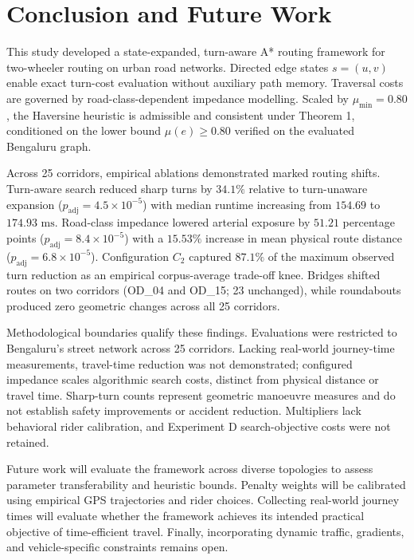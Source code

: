 \documentclass[conference]{IEEEtran}
\begin{document}
\section{Conclusion and Future Work}

This study developed a state-expanded, turn-aware A* routing framework for two-wheeler routing on urban road networks. Directed edge states $s = (u, v)$ enable exact turn-cost evaluation without auxiliary path memory. Traversal costs are governed by road-class-dependent impedance modelling. Scaled by $\mu_{\min} = 0.80$, the Haversine heuristic is admissible and consistent under Theorem 1, conditioned on the lower bound $\mu(e) \ge 0.80$ verified on the evaluated Bengaluru graph.

Across 25 corridors, empirical ablations demonstrated marked routing shifts. Turn-aware search reduced sharp turns by $34.1\%$ relative to turn-unaware expansion ($p_{\text{adj}} = 4.5 \times 10^{-5}$) with median runtime increasing from $154.69$ to $174.93\text{ ms}$. Road-class impedance lowered arterial exposure by $51.21$ percentage points ($p_{\text{adj}} = 8.4 \times 10^{-5}$) with a $15.53\%$ increase in mean physical route distance ($p_{\text{adj}} = 6.8 \times 10^{-5}$). Configuration $C_2$ captured $87.1\%$ of the maximum observed turn reduction as an empirical corpus-average trade-off knee. Bridges shifted routes on two corridors (OD\_04 and OD\_15; 23 unchanged), while roundabouts produced zero geometric changes across all 25 corridors.

Methodological boundaries qualify these findings. Evaluations were restricted to Bengaluru's street network across 25 corridors. Lacking real-world journey-time measurements, travel-time reduction was not demonstrated; configured impedance scales algorithmic search costs, distinct from physical distance or travel time. Sharp-turn counts represent geometric manoeuvre measures and do not establish safety improvements or accident reduction. Multipliers lack behavioral rider calibration, and Experiment D search-objective costs were not retained.

Future work will evaluate the framework across diverse topologies to assess parameter transferability and heuristic bounds. Penalty weights will be calibrated using empirical GPS trajectories and rider choices. Collecting real-world journey times will evaluate whether the framework achieves its intended practical objective of time-efficient travel. Finally, incorporating dynamic traffic, gradients, and vehicle-specific constraints remains open.

\balance


\end{document}
